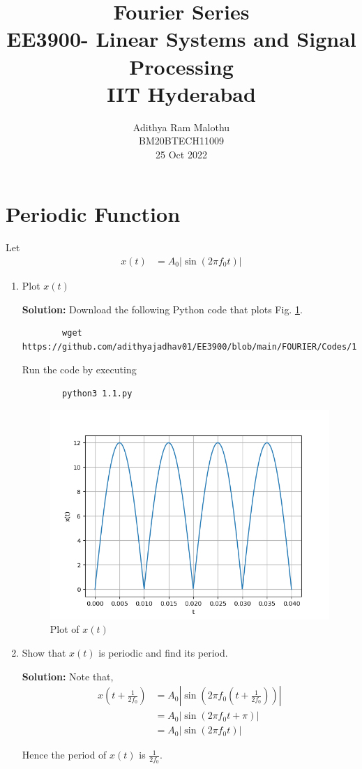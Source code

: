 \documentclass[journal,12pt,twocolumn]{IEEEtran}
\title{Fourier Series \\ \Large EE3900-  Linear Systems and Signal Processing \\ \large IIT Hyderabad}
\author{Adithya Ram Malothu \\ \normalsize BM20BTECH11009 \\ \vspace*{20pt} \normalsize 25 Oct 2022}
\newcommand{\solution}{\noindent \textbf{Solution: }}
\providecommand{\brak}[1]{\ensuremath{\left(#1\right)}}
\providecommand{\abs}[1]{\left\vert#1\right\vert}
\numberwithin{equation}{section}
\numberwithin{figure}{section}
\renewcommand\thesection{\arabic{section}}
\begin{document}
	\maketitle

	\section{Periodic Function}
	Let 
	\begin{align}
		x(t) &= A_0\abs{\sin\brak{2\pi f_0 t}}
		\label{eq:10-orig-diff-def}
	\end{align}

	\begin{enumerate}[label=\thesection.\arabic*,ref=\thesection.\theenumi]
	\item Plot $x(t)$
	
	\solution Download the following Python code that plots Fig. \ref{fig-1.1}.
	\begin{lstlisting}
		wget https://github.com/adithyajadhav01/EE3900/blob/main/FOURIER/Codes/1.1.py
	\end{lstlisting}
	
	Run the code by executing
	\begin{lstlisting}
		python3 1.1.py
	\end{lstlisting}

	\begin{figure}[!ht]
		\centering
		\includegraphics[width=\columnwidth]{./FIGURES/1.1.png}
		\caption{Plot of $x(t)$}
		\label{fig-1.1}	
	\end{figure}
	
\item Show that $x(t)$ is periodic and find its period.

\solution Note that,
\begin{align}
    x\brak{t+\frac{1}{2f_0}} &= A_0\abs{\sin\brak{2\pi f_0\brak{t + \frac{1}{2f_0}}}} \\
                            &= A_0\abs{\sin\brak{2\pi f_0t + \pi}} \\
                            &= A_0\abs{\sin\brak{2\pi f_0t}}
\end{align}

Hence the period of $x(t)$ is $\frac{1}{2f_0}$.
\end{enumerate}
\end{document}
